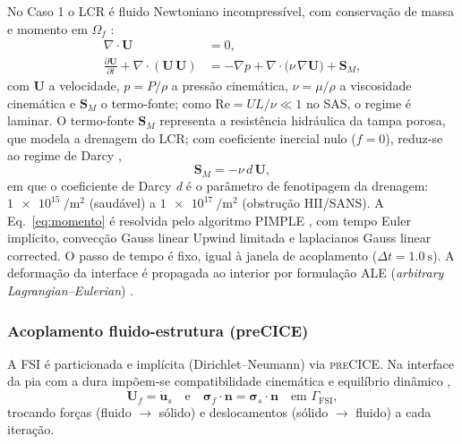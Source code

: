 \documentclass[article, hidelinks,oneside,12pt]{abntex2}
\begin{document}
No Caso 1 o LCR é fluido Newtoniano incompressível, com conservação de massa e momento em $\Omega_f$ \cite{ferziger, versteeg}:
\begin{align}
  \nabla\!\cdot\mathbf{U} &= 0,
  \label{eq:continuidade}\\[2pt]
  \frac{\partial \mathbf{U}}{\partial t}
  + \nabla\!\cdot(\mathbf{U}\,\mathbf{U})
  &= -\nabla p
  + \nabla\!\cdot\!\big(\nu\,\nabla\mathbf{U}\big)
  + \mathbf{S}_M,
  \label{eq:momento}
\end{align}
com $\mathbf{U}$ a velocidade, $p = P/\rho$ a pressão cinemática, $\nu = \mu/\rho$ a viscosidade cinemática e $\mathbf{S}_M$ o termo-fonte; como $\mathrm{Re} = U L/\nu \ll 1$ no SAS, o regime é laminar. O termo-fonte $\mathbf{S}_M$ representa a resistência hidráulica da tampa porosa, que modela a drenagem do LCR; com coeficiente inercial nulo ($f = 0$), reduz-se ao regime de Darcy \cite{nield2006},
\begin{equation}
  \mathbf{S}_M = -\nu\,d\,\mathbf{U},
  \label{eq:darcy}
\end{equation}
em que o coeficiente de Darcy \textit{d} é o parâmetro de fenotipagem da drenagem: $\SI{1e15}{\per\meter\squared}$ (saudável) a $\SI{1e17}{\per\meter\squared}$ (obstrução HII/SANS). A Eq.~\eqref{eq:momento} é resolvida pelo algoritmo PIMPLE \cite{versteeg, ferziger}, com tempo Euler implícito, convecção Gauss linear Upwind limitada e laplacianos Gauss linear corrected. O passo de tempo é fixo, igual à janela de acoplamento ($\Delta t = \SI{1.0}{\second}$). A deformação da interface é propagada ao interior por formulação ALE (\textit{arbitrary Lagrangian--Eulerian}) \cite{donea2003}.

\subsubsection*{Acoplamento fluido-estrutura (preCICE)}
\label{sec:teoria-fsi}

A FSI é particionada e implícita (Dirichlet--Neumann) via \textsc{preCICE}. Na interface da pia com a dura impõem-se compatibilidade cinemática e equilíbrio dinâmico \cite{bazilevs2013},
\begin{equation}
  \mathbf{U}_f = \dot{\mathbf{u}}_s
  \quad\text{e}\quad
  \boldsymbol{\sigma}_f\!\cdot\!\mathbf{n} = \boldsymbol{\sigma}_s\!\cdot\!\mathbf{n}
  \quad\text{em } \Gamma_{\mathrm{FSI}},
  \label{eq:fsi-interface}
\end{equation}
trocando forças (fluido $\rightarrow$ sólido) e deslocamentos (sólido $\rightarrow$ fluido) a cada iteração.
\end{document}

